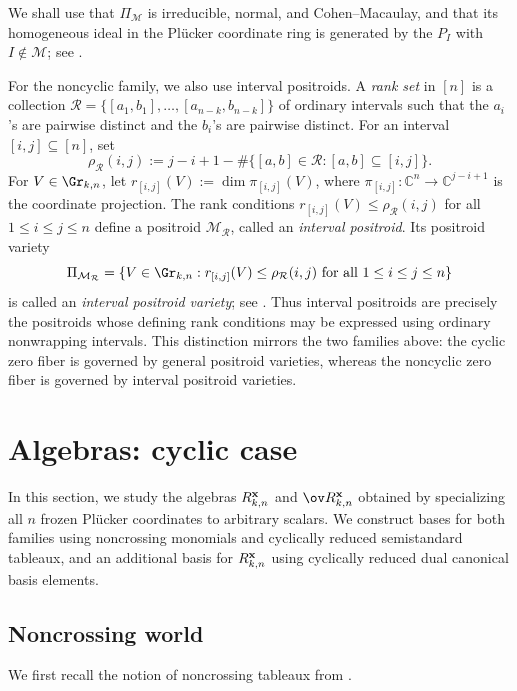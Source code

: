 \documentclass[11pt]{amsart}
\numberwithin{equation}{section}
\newcommand{\bC}{{\mathbb C}}
\newcommand{\bfx}{{\bf x}}
\begin{document}
We shall use that $\Pi_{\mathcal M}$ is irreducible, normal, and
Cohen--Macaulay, and that its homogeneous ideal in the Pl\"ucker
coordinate ring is generated by the $P_I$ with
$I\notin\mathcal M$; see \cite{KLS13,Lam14}.

For the noncyclic family, we also use interval positroids.  A
\emph{rank set} in $[n]$ is a collection
$\mathcal R=\{[a_1,b_1],\ldots,[a_{n-k},b_{n-k}]\}$ of ordinary
intervals such that the $a_i$'s are pairwise distinct and the
$b_i$'s are pairwise distinct.  For an interval
$[i,j]\subseteq[n]$, set
\[
\rho_{\mathcal R}(i,j)
:=
j-i+1-
\#\{[a,b]\in\mathcal R:[a,b]\subseteq[i,j]\}.
\]
For $V\in\Gr_{k,n}$, let
$r_{[i,j]}(V):=\dim\pi_{[i,j]}(V)$, where
$\pi_{[i,j]}:\bC^n\to\bC^{j-i+1}$ is the coordinate projection.
The rank conditions
$r_{[i,j]}(V)\leq\rho_{\mathcal R}(i,j)$ for all
$1\leq i\leq j\leq n$ define a positroid
$\mathcal M_{\mathcal R}$, called an \emph{interval positroid}.
Its positroid variety
\[
\Pi_{\mathcal M_{\mathcal R}}
=
\{V\in\Gr_{k,n}:
r_{[i,j]}(V)\leq\rho_{\mathcal R}(i,j)
\text{ for all }1\leq i\leq j\leq n\}
\]
is called an \emph{interval positroid variety}; see
\cite{Kn14,KL14,Paw18}.  Thus interval positroids are precisely the
positroids whose defining rank conditions may be expressed using
ordinary nonwrapping intervals.  This distinction mirrors the two
families above: the cyclic zero fiber is governed by general
positroid varieties, whereas the noncyclic zero fiber is governed by
interval positroid varieties.






\section{Algebras: cyclic case}\label{sec:algcyc}

In this section, we study the algebras $R_{k,n}^{\bfx}$ and
$\ov R_{k,n}^{\bfx}$ obtained by specializing all $n$ frozen
Pl\"ucker coordinates to arbitrary scalars.
We construct bases for both families using noncrossing monomials
and cyclically reduced semistandard tableaux, and an additional
basis for $R_{k,n}^{\bfx}$ using cyclically reduced dual canonical
basis elements.

\subsection{Noncrossing world}
We first recall the notion of noncrossing tableaux from \cite{Pyl09,PPS10,SSW17}. 
\end{document}
